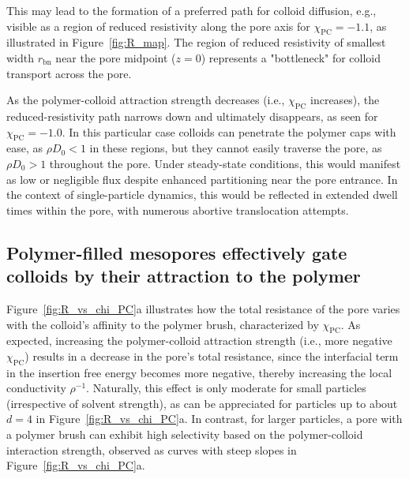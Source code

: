 \documentclass[12pt, a4paper]{article}
\begin{document}
This may lead to the formation of a preferred path for colloid diffusion, e.g., visible as a region of reduced resistivity along the pore axis for $\chi_{\text{PC}} = -1.1$, as illustrated in Figure~\ref{fig:R_map}.
The region of reduced resistivity of smallest width $r_{\text{bn}}$ near the pore midpoint ($z=0$) represents a "bottleneck" for colloid transport across the pore.

As the polymer-colloid attraction strength decreases (i.e., $\chi_{\text{PC}}$ increases), the reduced-resistivity path narrows down and ultimately disappears, as seen for $\chi_{\text{PC}} = -1.0$.
In this particular case colloids can penetrate the polymer caps with ease, as $\rho D_0 < 1 $ in these regions, but they cannot easily traverse the pore, as $\rho D_0 > 1 $ throughout the pore. 
Under steady-state conditions, this would manifest as low or negligible flux despite enhanced partitioning near the pore entrance. In the context of single-particle dynamics, this would be reflected in extended dwell times within the pore, with numerous abortive translocation attempts.


\subsection{Polymer-filled mesopores effectively gate colloids by their attraction to the polymer}

Figure~\ref{fig:R_vs_chi_PC}a illustrates how the total resistance of the pore varies with the colloid's affinity to the polymer brush, characterized by $\chi_{\text{PC}}$.
As expected, increasing the polymer-colloid attraction strength (i.e., more negative $\chi_{\text{PC}}$) results in a decrease in the pore's total resistance, since the interfacial term in the insertion free energy becomes more negative, thereby increasing the local conductivity $\rho^{-1}$.
Naturally, this effect is only moderate for small particles (irrespective of solvent strength), as can be appreciated for particles up to about $d = 4$ in Figure~\ref{fig:R_vs_chi_PC}a.
In contrast, for larger particles, a pore with a polymer brush can exhibit high selectivity based on the polymer-colloid interaction strength, observed as curves with steep slopes in Figure~\ref{fig:R_vs_chi_PC}a.
\end{document}
